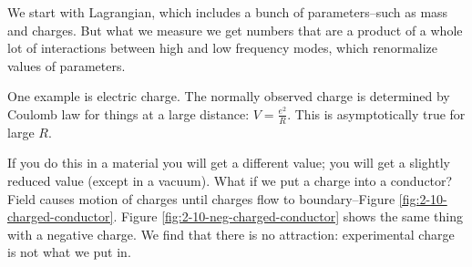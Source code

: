 \documentclass[]{article}
\begin{document}
We start with Lagrangian, which includes a bunch of parameters--such as mass and charges. But what we measure we get numbers that are a product of a whole lot of interactions between high and low frequency modes, which renormalize values of parameters.

One example is electric charge. The normally observed charge is determined by Coulomb law for things at a large distance: $V=\frac{e^2}{R}$. This is asymptotically true for large $R$.

If you do this in a material you will get a different value; you will get a slightly reduced value (except in a vacuum). What if we put a charge into a conductor? Field causes motion of charges until charges flow to boundary--Figure \ref{fig:2-10-charged-conductor}. Figure \ref{fig:2-10-neg-charged-conductor} shows the same thing with a negative charge. We find that there is no attraction: experimental charge is not what we put in.
\end{document}

